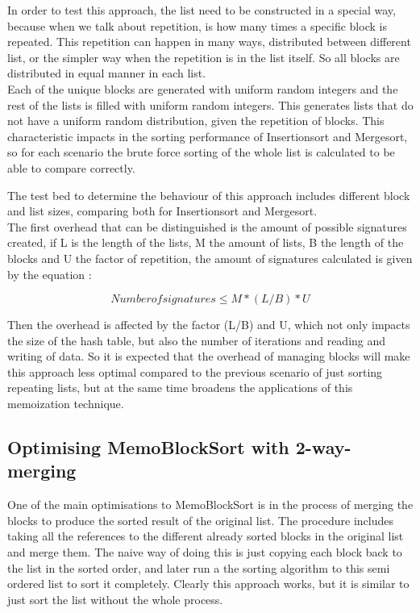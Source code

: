 \documentclass[a4paper,12pt]{article}
\begin{document}
In order to test this approach, the list need to be constructed in a special way, because when we talk about repetition, is how many times a specific block is repeated. This repetition can happen in many ways, distributed between different list, or the simpler way when the repetition is in the list itself. So all blocks are distributed in equal manner in each list.\\

Each of the unique blocks are generated with uniform random integers and the rest of the lists is filled with uniform random integers. This generates lists that do not have a uniform random distribution, given the repetition of blocks. This characteristic impacts in the sorting performance of Insertionsort and Mergesort, so for each scenario the brute force sorting of the whole list is calculated to be able to compare correctly. 

The test bed to determine the behaviour of this approach includes different block and list sizes, comparing both for Insertionsort and Mergesort. \\

The first overhead that can be distinguished is the amount of possible signatures created, if L is the length of the lists, M the amount of lists, B the length of the blocks and U the factor of repetition, the amount of signatures calculated is given by the equation :

\begin{equation}
Number of signatures \leq  M * (L / B) * U
\end{equation}

Then the overhead is affected by the factor (L/B) and U, which not only impacts the size of the hash table, but also the number of iterations and reading and writing of data. So it is expected that the overhead of managing blocks will make this approach less optimal compared to the previous scenario of just sorting repeating lists, but at the same time broadens the applications of this memoization technique.

\subsection{Optimising MemoBlockSort with 2-way-merging}
One of the main optimisations to MemoBlockSort is in the process of merging the blocks to produce the sorted result of the original list. The procedure includes taking all the references to the different already sorted blocks in the original list and merge them. The naive way of doing this is just copying each block back to the list in the sorted order, and later run a the sorting algorithm to this semi ordered list to sort it completely. Clearly this approach works, but it is similar to just sort the list without the whole process.
\end{document}
